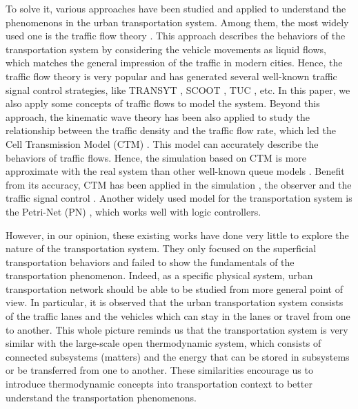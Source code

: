 \documentclass[preprint,authoryear,12pt]{elsarticle}
\begin{document}
To solve it, various approaches have been studied and applied to understand the phenomenons in the urban transportation system. Among them, the most widely used one is the traffic flow theory \citep{nathan_h_gartner_revised_2005}. This approach describes the behaviors of the transportation system by considering the vehicle movements as liquid flows, which matches the general impression of the traffic in modern cities. Hence, the traffic flow theory is very popular and has generated several well-known traffic signal control strategies, like TRANSYT \citep{robertson_tansyt_1969,hale_traffic_2005}, SCOOT \citep{bretherton_r_d_scoot_1982}, TUC \citep{diakaki_multivariable_2002}, etc. In this paper, we also apply some concepts of traffic flows to model the system. Beyond this approach, the kinematic wave theory has been also applied to study the relationship between the traffic density and the traffic flow rate, which led the Cell Transmission Model (CTM) \citep{daganzo_cell_1995,flotterod_operational_2011}. This model can accurately describe the behaviors of traffic flows. Hence, the simulation based on CTM is more approximate with the real system than other well-known queue models \citep{almasri_online_2005}. Benefit from its accuracy, CTM has been applied in the simulation \citep{Su2013}, the observer \citep{CanudasdeWit2012} and the traffic signal control \citep{Pohlmann2010}. Another widely used model for the transportation system is the Petri-Net (PN) \citep{dotoli_urban_2006,ng_review_2013}, which works well with logic controllers.

However, in our opinion, these existing works have done very little to explore the nature of the transportation system. They only focused on the superficial transportation behaviors and failed to show the fundamentals of the transportation phenomenon. Indeed, as a specific physical system, urban transportation network should be able to be studied from more general point of view. In particular, it is observed that the urban transportation system consists of the traffic lanes and the vehicles which can stay in the lanes or travel from one to another. This whole picture reminds us that the transportation system is very similar with the large-scale open thermodynamic system, which consists of connected subsystems (matters) and the energy that can be stored in subsystems or be transferred from one to another. These similarities encourage us to introduce thermodynamic concepts into transportation context to better understand the transportation phenomenons.
\end{document}
